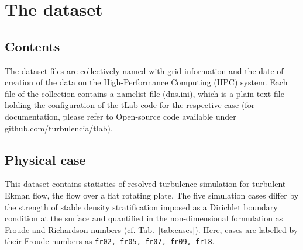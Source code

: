 \documentclass[11pt]{article}
\begin{document}
\section{The dataset}

\subsection{Contents}

The dataset files are collectively named with grid information and the date of creation of the data on the 
High-Performance Computing (HPC) system. Each file of the collection contains a namelist file (dns.ini), 
which is a plain text file holding the configuration of the tLab code for the respective case 
(for documentation, please refer to Open-source code available under github.com/turbulencia/tlab). \\

\subsection{Physical case}

This dataset contains statistics of resolved-turbulence simulation for turbulent Ekman flow, 
the flow over a flat rotating plate. 
The five simulation cases differ by the strength of stable density stratification imposed as a Dirichlet boundary condition at the surface 
and quantified in the non-dimensional formulation as Froude and Richardson numbers (cf. Tab.~\ref{tab:cases}).
Here, cases are labelled by their Froude numbers as \texttt{fr02, fr05, fr07, fr09, fr18}.
\end{document}
